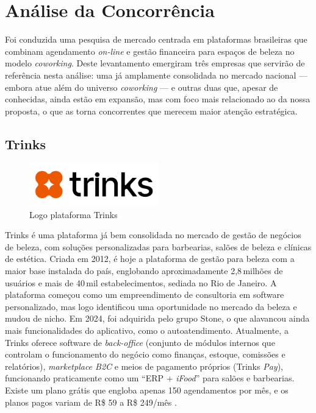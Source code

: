 \section{Análise da Concorrência}

Foi conduzida uma pesquisa de mercado centrada em plataformas brasileiras que combinam agendamento \emph{on-line} e gestão financeira para espaços de beleza no modelo \emph{coworking}. Deste levantamento emergiram três empresas que servirão de referência nesta análise: uma já amplamente consolidada no mercado nacional — embora atue além do universo \emph{coworking} — e outras duas que, apesar de conhecidas, ainda estão em expansão, mas com foco mais relacionado ao da nossa proposta, o que as torna concorrentes que merecem maior atenção estratégica.

\subsection{Trinks}

\begin{figure}[htb]
	\centering
	\includegraphics[width=0.5\textwidth]{cap01-Introducao/Images/1.4.1_Trinks}
	\caption{Logo plataforma Trinks}
	\label{fig:Trinks}
\end{figure}

 \FloatBarrier

Trinks é uma plataforma já bem consolidada no mercado de gestão de negócios de beleza, com soluções
personalizadas para barbearias, salões de beleza e clínicas de estética. Criada em 2012, é hoje a
plataforma de gestão para beleza com a maior base instalada do país, englobando aproximadamente
2,8\,milhões de usuários e mais de 40\,mil estabelecimentos, sediada no Rio de Janeiro. A plataforma começou como um empreendimento de consultoria em software personalizado, mas logo identificou uma oportunidade no mercado da beleza e mudou de nicho. Em 2024, foi adquirida pelo grupo Stone, o que alavancou ainda mais funcionalidades do aplicativo, como o autoatendimento.
Atualmente, a Trinks oferece software de \emph{back-office} (conjunto de módulos internos que controlam o funcionamento do negócio como finanças, estoque, comissões e relatórios), \emph{marketplace B2C} e meios de pagamento próprios (Trinks \emph{Pay}), funcionando praticamente como um “ERP + \emph{iFood}” para salões e barbearias. Existe um
plano grátis que engloba apenas 150 agendamentos por mês, e os planos pagos variam de R\$ 59 a R\$ 249/mês \cite{Trinks}.

